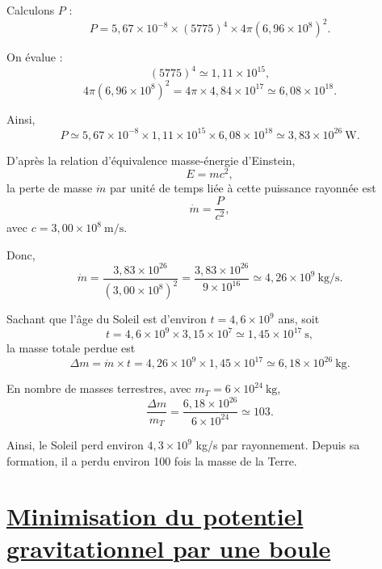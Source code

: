 \documentclass[a4paper,10pt]{report}
\begin{document}
Calculons $P$ :
\[
P = 5{,}67 \times 10^{-8} \times (5775)^4 \times 4 \pi (6{,}96 \times 10^{8})^2.
\]

On évalue :
\[
(5775)^4 \simeq 1{,}11 \times 10^{15},
\]
\[
4 \pi (6{,}96 \times 10^{8})^2 = 4 \pi \times 4{,}84 \times 10^{17} \simeq 6{,}08 \times 10^{18}.
\]

Ainsi,
\[
P \simeq 5{,}67 \times 10^{-8} \times 1{,}11 \times 10^{15} \times 6{,}08 \times 10^{18} \simeq 3{,}83 \times 10^{26}\ \text{W}.
\]

D'après la relation d'équivalence masse-énergie d'Einstein,
\[
E = m c^2,
\]
la perte de masse $\dot{m}$ par unité de temps liée à cette puissance rayonnée est
\[
\dot{m} = \frac{P}{c^2},
\]
avec $c = 3{,}00 \times 10^8\ \text{m/s}$.

Donc,
\[
\dot{m} = \frac{3{,}83 \times 10^{26}}{(3{,}00 \times 10^8)^2} = \frac{3{,}83 \times 10^{26}}{9 \times 10^{16}} \simeq 4{,}26 \times 10^9\ \text{kg/s}.
\]


Sachant que l'âge du Soleil est d'environ $t = 4{,}6 \times 10^{9}$ ans, soit
\[
t = 4{,}6 \times 10^{9} \times 3{,}15 \times 10^{7} \simeq 1{,}45 \times 10^{17}\ \text{s},
\]
la masse totale perdue est
\[
\Delta m = \dot{m} \times t = 4{,}26 \times 10^{9} \times 1{,}45 \times 10^{17} \simeq 6{,}18 \times 10^{26}\ \text{kg}.
\]

En nombre de masses terrestres, avec $m_T = 6 \times 10^{24}\ \text{kg}$,
\[
\frac{\Delta m}{m_T} = \frac{6{,}18 \times 10^{26}}{6 \times 10^{24}} \simeq 103.
\]
 
Ainsi, le Soleil perd environ $4{,}3 \times 10^{9}$ kg/s par rayonnement.  
Depuis sa formation, il a perdu environ 100 fois la masse de la Terre.


	\newpage \section{\hyperref[subsec:Sphère_min]{Minimisation du potentiel gravitationnel par une boule}}\label{subsec:correctionSphère_min}
		
\end{document}
